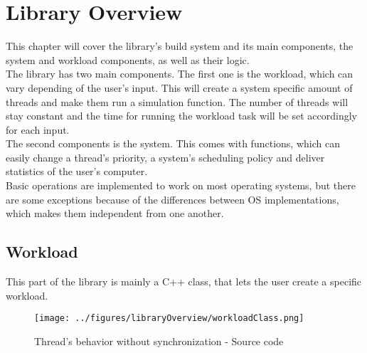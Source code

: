 \chapter{Library Overview}
This chapter will cover the library's build system and its main components, the system and workload components, as well as their logic.\\
The library has two main components. The first one is the workload, which can vary depending of the user's input. This will create a system specific amount of threads and make them run a simulation function. The number of threads will stay constant and the time for running the workload task will be set accordingly for each input.\\
The second components is the system. This comes with functions, which can easily change a thread's priority, a system's scheduling policy and deliver statistics of the user's computer.\\
Basic operations are implemented to work on most operating systems, but there are some exceptions because of the differences between OS implementations, which makes them independent from one another.
\section{Workload}
This part of the library is mainly a C++ class, that lets the user create a specific workload.
\begin{figure}[!htb]
	\centering
	\texttt{[image: ../figures/libraryOverview/workloadClass.png]}
	\caption{Thread's behavior without synchronization - Source code}
\end{figure}
